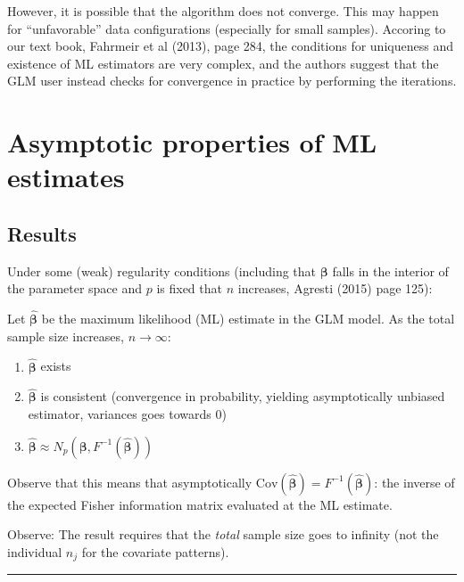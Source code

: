 \documentclass[
]{article}
\providecommand{\tightlist}{%
  \setlength{\itemsep}{0pt}\setlength{\parskip}{0pt}}
\begin{document}
However, it is possible that the algorithm does not converge. This may
happen for ``unfavorable'' data configurations (especially for small
samples). Accoring to our text book, Fahrmeir et al (2013), page 284,
the conditions for uniqueness and existence of ML estimators are very
complex, and the authors suggest that the GLM user instead checks for
convergence in practice by performing the iterations.

\hypertarget{asymptotic-properties-of-ml-estimates}{%
\section{Asymptotic properties of ML
estimates}\label{asymptotic-properties-of-ml-estimates}}

\hypertarget{results}{%
\subsection{Results}\label{results}}

Under some (weak) regularity conditions (including that
\(\boldsymbol{\beta}\) falls in the interior of the parameter space and
\(p\) is fixed that \(n\) increases, Agresti (2015) page 125):

Let \(\hat{\boldsymbol{\beta}}\) be the maximum likelihood (ML) estimate
in the GLM model. As the total sample size increases,
\(n\rightarrow \infty\):

\begin{enumerate}
\def\labelenumi{\arabic{enumi}.}
\tightlist
\item
  \(\hat{\boldsymbol{\beta}}\) exists
\item
  \(\hat{\boldsymbol{\beta}}\) is consistent (convergence in
  probability, yielding asymptotically unbiased estimator, variances
  goes towards 0)
\item
  \(\hat{\boldsymbol{\beta}} \approx N_p(\boldsymbol{\beta},F^{-1}(\hat{\boldsymbol{\beta}}))\)
\end{enumerate}

Observe that this means that asymptotically
\(\text{Cov}(\hat{\boldsymbol{\beta}})=F^{-1}(\hat{\boldsymbol{\beta}})\):
the inverse of the expected Fisher information matrix evaluated at the
ML estimate.

Observe: The result requires that the \emph{total} sample size goes to
infinity (not the individual \(n_j\) for the covariate patterns).

\begin{center}\rule{0.5\linewidth}{0.5pt}\end{center}
\end{document}
